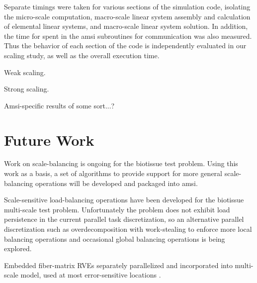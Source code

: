 \documentclass[11pt]{siamltex1213}
\begin{document}
Separate timings were taken for various sections of the simulation code, isolating the micro-scale computation, macro-scale linear system assembly and calculation of elemental linear systems, and macro-scale linear system solution. In addition, the time for spent in the amsi subroutines for communication was also measured. Thus the behavior of each section of the code is independently evaluated in our scaling study, as well as the overall execution time.

Weak scaling.

Strong scaling.

Amsi-specific results of some sort...?

\section{Future Work}\label{future_work}

Work on scale-balancing is ongoing for the biotissue test problem. Using this work as a basis, a set of algorithms to provide support for more general scale-balancing operations will be developed and packaged into amsi.

Scale-sensitive load-balancing operations have been developed for the biotissue multi-scale test problem. Unfortunately the problem does not exhibit load persistence in the current parallel task discretization, so an alternative parallel discretization such as overdecomposition with work-stealing to enforce more local balancing operations and occasional global balancing operations is being explored.

Embedded fiber-matrix RVEs separately parallelized and incorporated into multi-scale model, used at most error-sensitive locations \cite{lake2012mechanics} \cite{zhang2013cross} \cite{zhang2013coupled}.


\end{document}
